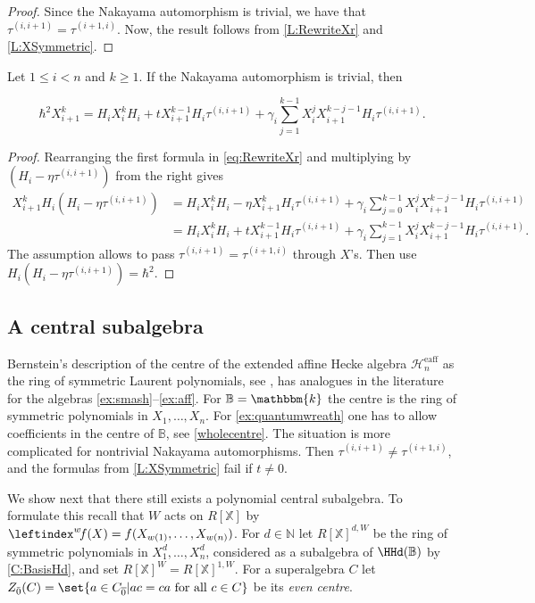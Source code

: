 \documentclass[a4paper,11pt]{amsart}
\let\ov\overline
\numberwithin{equation}{subsection}
\theoremstyle{definition}
\theoremstyle{theorem}
\theoremstyle{remark}
\newcommand\Sym{W}
\newcommand\Heaff{\mathscr{H}^{\text{eaff}}_n}
\newcommand\N{\mathbb{N}}
\newcommand\X{\mathbb{X}}
\newcommand\kk{\mathbbm{k}}
\newcommand\RR{R}
\newcommand\RX{{\RR[\X]}}
\newcommand{\Bo}{\mathbb{B}}
\begin{document}
  \begin{proof}  Since the Nakayama automorphism is trivial,  we have that $\tau^{(i,i+1)}=\tau^{(i+1,i)}$.
   Now, the result follows from  \autoref{L:RewriteXr} and \autoref{L:XSymmetric}.
  \end{proof}

  \begin{Corollary}\label{C:Xpowers}
   Let  $1\le i<n$ and $k\ge1$.  If the Nakayama automorphism is trivial, then

   \[
       \hbar^2 X_{i+1}^k =
       H_iX_i^kH_i+ t X_{i+1}^{k-1}H_i\tau^{(i,i+1)}
       +\gamma_i\sum_{j=1}^{k-1}X_i^jX_{i+1}^{k-j-1}H_i\tau^{(i,i+1)}.
   \]
  \end{Corollary}

  \begin{proof}
    Rearranging the first formula in \autoref{eq:RewriteXr} and multiplying by $(H_i-\eta\tau^{(i,i+1)})$ from the right gives
     \begin{align*}
    X_{i+1}^kH_i(H_i-\eta\tau^{(i,i+1)})  &=H_iX_i^kH_i-\eta X_{i+1}^kH_i\tau^{(i,i+1)}+\gamma_i\sum_{j=0}^{k-1}X_{i}^jX_{i+1}^{k-j-1}H_i\tau^{(i,i+1)}\\
   & =H_iX_i^kH_i+ t X_{i+1}^{k-1}H_i\tau^{(i,i+1)}+\gamma_i\sum_{j=1}^{k-1}X_{i}^jX_{i+1}^{k-j-1}H_i\tau^{(i,i+1)}.
 \end{align*}
  The assumption allows to pass $\tau^{(i,i+1)}=\tau^{(i+1,i)}$ through $X$'s.  Then  use  $H_i(H_i-\eta\tau^{(i,i+1)})=\hbar^2$.
     \end{proof}

\subsection{A central subalgebra}
Bernstein's description of the centre of the extended affine Hecke algebra $\Heaff$ as
the ring of symmetric Laurent polynomials, see
\cite[Proposition~3.11]{Lusztig:AffineGradedHecke}, has analogues in the literature for
the algebras \autoref{ex:smash}--\autoref{ex:aff}. For $\Bo=\kk$ the centre is the ring of
symmetric polynomials in $X_1,\dots,X_n$. For \autoref{ex:quantumwreath} one
has to allow coefficients in the centre of $\Bo$, see \autoref{wholecentre}.
The situation is more complicated for nontrivial Nakayama automorphisms. Then
$\tau^{(i,i+1)}\ne\tau^{(i+1,i)}$, and the formulas from \autoref{L:XSymmetric} fail
if $t\ne0$.

We show next that there still exists a  polynomial central subalgebra. To formulate this recall that $\Sym$ acts on $\RX$ by $\leftindex^w\!f(X)=f(X_{w(1)},\dots,X_{w(n)})$.
For $d\in\N$ let $\RX^{d,\Sym}$ be the ring of symmetric polynomials in
$X_1^d,\dots,X_n^d$, considered as a subalgebra of $\HHd(\Bo)$ by \autoref{C:BasisHd},
and set $\RX^{\Sym}=\RX^{1,\Sym}$. For a superalgebra $C$ let
$Z_{\bar{0}}(C)=\set{a\in C_{\ov0}|ac=ca\text{ for all }c\in C}$ be its \emph{even centre}.
\end{document}
